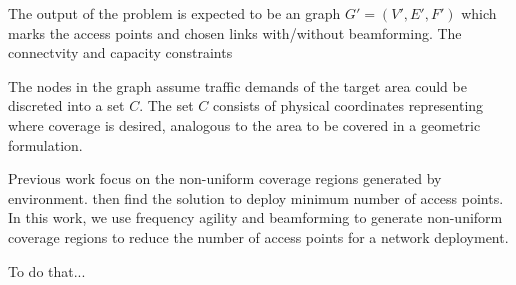 The output of the problem is expected to be an graph $G' = (V',E',F')$ which marks the access points
and chosen links with/without beamforming. The connectvity and capacity constraints 
 

 
The nodes in the graph assume traffic demands of the target area could be discreted 
into a set $C$. The set $C$ consists of physical coordinates representing 
where coverage is desired, analogous to the area to be covered in a geometric formulation.

Previous work focus on the non-uniform coverage regions generated by environment. then find the 
solution to deploy minimum number of access points. In this work, we use frequency agility and 
beamforming to generate non-uniform coverage regions to reduce the number of access points
for a network deployment.

To do that...


